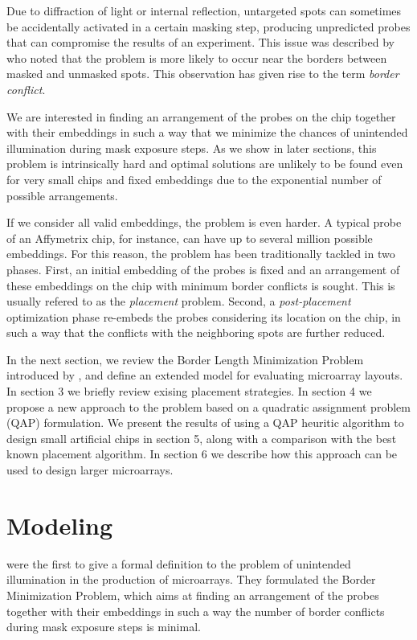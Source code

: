\documentclass{bioinfo}
\begin{document}
Due to diffraction of light or internal reflection, untargeted spots can sometimes be accidentally activated in a certain masking step, producing unpredicted probes that can compromise the results of an experiment. This issue was described by \citealp{FODOR91} who noted that the problem is more likely to occur near the borders between masked and unmasked spots. This observation has given rise to the term \emph{border conflict}.

We are interested in finding an arrangement of the probes on the chip together with their embeddings in such a way that we minimize the chances of unintended illumination during mask exposure steps. As we show in later sections, this problem is intrinsically hard and optimal solutions are unlikely to be found even for very small chips and fixed embeddings due to the exponential number of possible arrangements.

If we consider all valid embeddings, the problem is even harder. A typical probe of an Affymetrix chip, for instance, can have up to several million possible embeddings. For this reason, the problem has been traditionally tackled in two phases. First, an initial embedding of the probes is fixed and an arrangement of these embeddings on the chip with minimum border conflicts is sought. This is usually refered to as the \emph{placement} problem. Second, a \emph{post-placement} optimization phase re-embeds the probes considering its location on the chip, in such a way that the conflicts with the neighboring spots are further reduced.

In the next section, we review the Border Length Minimization Problem introduced by \citealp{HANNENHALLI02}, and define an extended model for evaluating microarray layouts. In section 3 we briefly review exising placement strategies. In section 4 we propose a new approach to the problem based on a quadratic assignment problem (QAP) formulation. We present the results of using a QAP heuritic algorithm to design small artificial chips in section 5, along with a comparison with the best known placement algorithm. In section 6 we describe how this approach can be used to design larger microarrays.

\section{Modeling}

\citealp{HANNENHALLI02} were the first to give a formal definition to the problem of unintended illumination in the production of microarrays. They formulated the Border Minimization Problem, which aims at finding an arrangement of the probes together with their embeddings in such a way the number of border conflicts during mask exposure steps is minimal.
\end{document}
